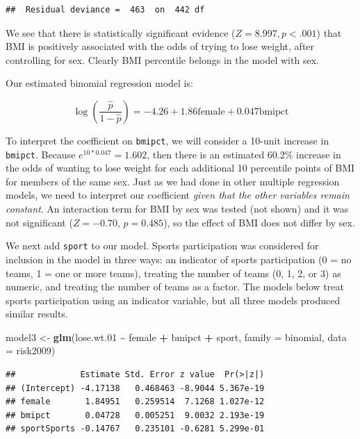 \documentclass[
]{krantz}
\newenvironment{Shaded}{\begin{snugshade}}{\end{snugshade}}
\newcommand{\AttributeTok}[1]{\textcolor[rgb]{0.27,0.27,0.27}{#1}}
\newcommand{\FloatTok}[1]{\textcolor[rgb]{0.06,0.06,0.06}{#1}}
\newcommand{\FunctionTok}[1]{\textcolor[rgb]{0.27,0.27,0.27}{\textbf{#1}}}
\newcommand{\NormalTok}[1]{#1}
\newcommand{\OtherTok}[1]{\textcolor[rgb]{0.37,0.37,0.37}{#1}}
\newcommand{\SpecialCharTok}[1]{\textcolor[rgb]{0.43,0.43,0.43}{\textbf{#1}}}
\begin{document}
\begin{verbatim}
##  Residual deviance =  463  on  442 df
\end{verbatim}

We see that there is statistically significant evidence (\(Z=8.997, p<.001\)) that BMI is positively associated with the odds of trying to lose weight, after controlling for sex. Clearly BMI percentile belongs in the model with sex.

Our estimated binomial regression model is:

\[\log\left(\frac{\hat{p}}{1-\hat{p}}\right)= -4.26+1.86\textrm{female}+0.047\textrm{bmipct}\]

To interpret the coefficient on \texttt{bmipct}, we will consider a 10-unit increase in \texttt{bmipct}. Because \(e^{10*0.047}=1.602\), then there is an estimated 60.2\% increase in the odds of wanting to lose weight for each additional 10 percentile points of BMI for members of the same sex. Just as we had done in other multiple regression models, we need to interpret our coefficient \emph{given that the other variables remain constant}. An interaction term for BMI by sex was tested (not shown) and it was not significant (\(Z=-0.70\), \(p=0.485\)), so the effect of BMI does not differ by sex.

We next add \texttt{sport} to our model. Sports participation was considered for inclusion in the model in three ways: an indicator of sports participation (0 = no teams, 1 = one or more teams), treating the number of teams (0, 1, 2, or 3) as numeric, and treating the number of teams as a factor. The models below treat sports participation using an indicator variable, but all three models produced similar results.

\begin{Shaded}
\begin{Highlighting}[]
\NormalTok{model3 }\OtherTok{\textless{}{-}} \FunctionTok{glm}\NormalTok{(lose.wt}\FloatTok{.01} \SpecialCharTok{\textasciitilde{}}\NormalTok{ female }\SpecialCharTok{+}\NormalTok{ bmipct }\SpecialCharTok{+}\NormalTok{ sport, }
              \AttributeTok{family =}\NormalTok{ binomial, }\AttributeTok{data =}\NormalTok{ risk2009)}
\end{Highlighting}
\end{Shaded}

\begin{verbatim}
##             Estimate Std. Error z value  Pr(>|z|)
## (Intercept) -4.17138   0.468463 -8.9044 5.367e-19
## female       1.84951   0.259514  7.1268 1.027e-12
## bmipct       0.04728   0.005251  9.0032 2.193e-19
## sportSports -0.14767   0.235101 -0.6281 5.299e-01
\end{verbatim}
\end{document}
